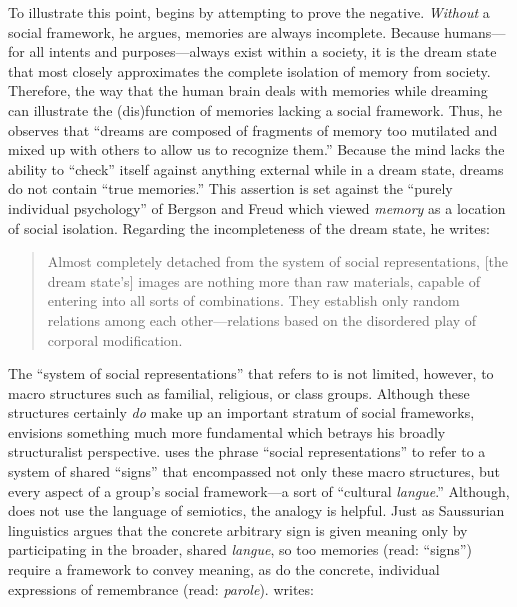 To illustrate this point, \halbwachs begins
 by attempting to prove the negative.
\emph{Without} a social framework, he argues, memories are always
incomplete. Because humans---for all intents and purposes---always exist
within a society, it is the dream state that most closely approximates
the complete isolation of memory from society. Therefore, the way that
the human brain deals with memories while dreaming can illustrate the
(dis)function of memories lacking a social framework. Thus, he observes
that ``dreams are composed of fragments of memory too mutilated and
mixed up with others to allow us to recognize
them.''\autocite[41]{halbwachs1992} Because the mind lacks the ability
to ``check'' itself against anything external while in a dream state,
dreams do not contain ``true memories.''\autocite[41]{halbwachs1992}
This assertion is set against the ``purely individual psychology'' of
Bergson and Freud which viewed \emph{memory} as a location of social
isolation.\autocites[See][]{ansellpearson_radstone-schwarz2011}[and][]{terdiman_radstone-schwarz2011}
Regarding the incompleteness of the dream state, he writes:

\begin{quote}
Almost completely detached from the system of social representations,
{[}the dream state's{]} images are nothing more than raw materials,
capable of entering into all sorts of combinations. They establish only
random relations among each other---relations based on the disordered
play of corporal modification.\autocite[42]{halbwachs1992}
\end{quote}

The ``system of social representations'' that \halbwachs
refers to is not limited, however, to macro structures such as familial,
religious, or class groups. Although these structures certainly
\emph{do} make up an important stratum of social frameworks,
\halbwachs envisions something much more fundamental
which betrays his broadly structuralist perspective.
\halbwachs uses the phrase ``social representations'' to
refer to a system of shared ``signs'' that encompassed not only these
macro structures, but every aspect of a group's social framework---a
sort of ``cultural \emph{langue}.'' Although, \halbwachs
does not use the language of semiotics, the analogy is helpful. Just as
Saussurian linguistics argues that the concrete arbitrary sign is given
meaning only by participating in the broader, shared \emph{langue}, so
too memories (read: ``signs'') require a framework to convey meaning, as
do the concrete, individual expressions of remembrance (read:
\emph{parole}). \halbwachs writes:

